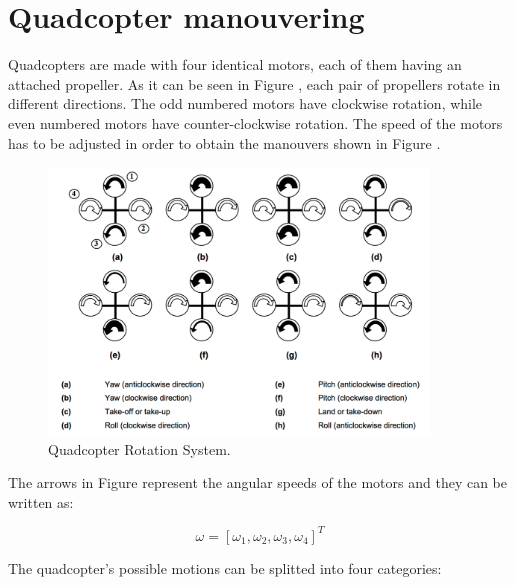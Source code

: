 \section{Quadcopter manouvering}
Quadcopters are made with four identical motors, each of them having an attached propeller. As it can be seen in Figure \label{rollpitchyaw}, each pair of propellers rotate in different directions. The odd numbered motors have clockwise rotation, while even numbered motors have counter-clockwise rotation. The speed of the motors has to be adjusted in order to obtain the manouvers shown in Figure \label{rollpitchyaw}. 

\begin{figure}[H]
  \centering
    \includegraphics[width=0.9\textwidth]{images/rollpitchyaw.png}
	\caption{Quadcopter Rotation System.}
	\label{rollpitchyaw}
\end{figure}


The arrows in Figure \label{rollpitchyaw} represent the angular speeds of the motors and they can be written as:

\begin{equation}
	\omega=[\omega_{1}, \omega_{2}, \omega_{3}, \omega_{4}] ^{T}
\end{equation} 

The quadcopter's possible motions can be splitted into four categories:

